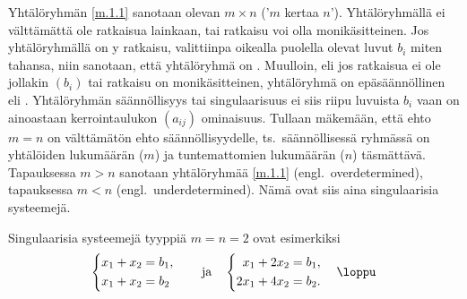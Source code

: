Yhtälöryhmän \eqref{m.1.1} sanotaan olevan  $m \times n$ ('$m$ kertaa $n$'). 
Yhtälöryhmällä ei välttämättä ole ratkaisua lainkaan, tai ratkaisu voi olla monikäsitteinen. Jos
yhtälöryhmällä on y ratkaisu, valittiinpa oikealla puolella olevat luvut
$b_i$ miten tahansa, niin sanotaan, että yhtälöryhmä on
%
. Muulloin, eli jos
ratkaisua ei ole jollakin $(b_i)$ tai ratkaisu on monikäsitteinen, yhtälöryhmä on 
%
epäsäännöllinen eli . Yhtälöryhmän säännöllisyys tai singulaarisuus ei siis
riipu luvuista $b_i$ vaan on ainoastaan kerrointaulukon $(a_{ij})$ ominaisuus. Tullaan mäkemään,
että ehto $m=n$ on välttämätön ehto säännöllisyydelle, ts.\ säännöllisessä ryhmässä on 
yhtälöiden lukumäärän ($m$) ja tuntemattomien lukumäärän ($n$) täsmättävä. Tapauksessa $m>n$ 
sanotaan yhtälöryhmää \eqref{m.1.1}  (engl.\ overdetermined), tapauksessa
$m<n$  (engl.\ underdetermined). Nämä ovat siis aina singulaarisia 
systeemejä. 
\begin{Exa} Singulaarisia systeemejä tyyppiä $m=n=2$ ovat esimerkiksi
\[
\begin{cases} 
\begin{aligned} x_1 +  x_2 &= b_1, \\ x_1  +  x_2 &= b_2 \end{aligned} 
\end{cases} \quad \text{ja} \quad
\begin{cases}
\begin{aligned} x_1 + 2x_2 &= b_1, \\ 2x_1 + 4x_2 &= b_2. \end{aligned} 
\end{cases} \loppu 
\] 
\end{Exa}

